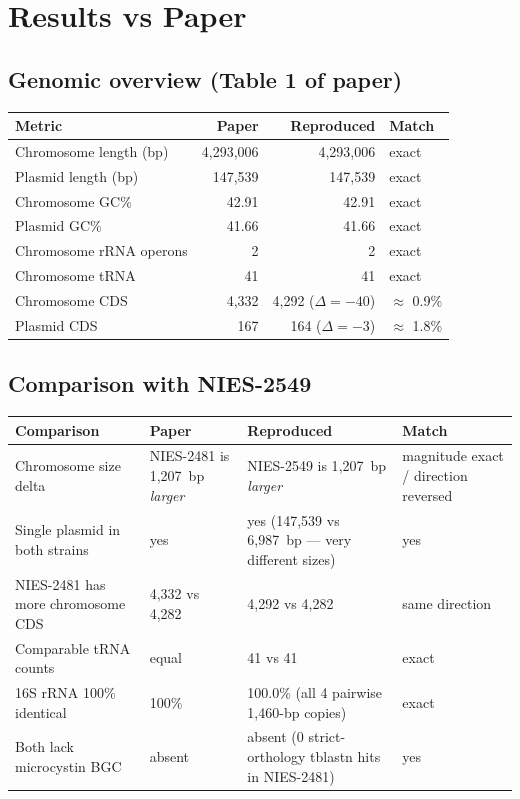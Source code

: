 \documentclass[11pt,letterpaper]{article}
\begin{document}
\section{Results vs Paper}

\subsection{Genomic overview (Table 1 of paper)}
\begin{center}
\begin{tabular}{lrrl}
\toprule
Metric & Paper & Reproduced & Match \\
\midrule
Chromosome length (bp)   & 4{,}293{,}006 & 4{,}293{,}006 & exact \\
Plasmid length (bp)       & 147{,}539     & 147{,}539     & exact \\
Chromosome GC\%           & 42.91         & 42.91         & exact \\
Plasmid GC\%              & 41.66         & 41.66         & exact \\
Chromosome rRNA operons   & 2             & 2             & exact \\
Chromosome tRNA           & 41            & 41            & exact \\
Chromosome CDS            & 4{,}332       & 4{,}292 ($\Delta=-40$) & $\approx$ 0.9\% \\
Plasmid CDS               & 167           & 164 ($\Delta=-3$)      & $\approx$ 1.8\% \\
\bottomrule
\end{tabular}
\end{center}

\subsection{Comparison with NIES-2549}
\begin{center}
\begin{tabular}{p{5.8cm}p{4.4cm}p{4.4cm}l}
\toprule
Comparison & Paper & Reproduced & Match \\
\midrule
Chromosome size delta & NIES-2481 is 1{,}207~bp \emph{larger} & NIES-2549 is 1{,}207~bp \emph{larger} & magnitude exact / direction reversed \\
Single plasmid in both strains & yes & yes (147{,}539 vs 6{,}987~bp --- very different sizes) & yes \\
NIES-2481 has more chromosome CDS & 4{,}332 vs 4{,}282 & 4{,}292 vs 4{,}282 & same direction \\
Comparable tRNA counts & equal & 41 vs 41 & exact \\
16S rRNA 100\% identical & 100\% & 100.0\% (all 4 pairwise 1{,}460-bp copies) & exact \\
Both lack microcystin BGC & absent & absent (0 strict-orthology tblastn hits in NIES-2481) & yes \\
\bottomrule
\end{tabular}
\end{center}
\end{document}
